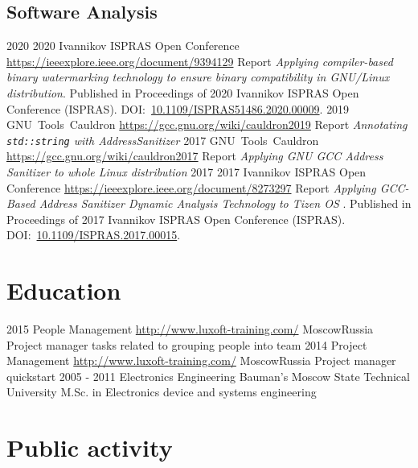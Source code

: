 \documentclass[11pt,a4paper]{moderncv}
\begin{document}
\subsection{Software Analysis}
  \cventry
    {2020}
    {2020 Ivannikov ISPRAS Open Conference}
    {\url{https://ieeexplore.ieee.org/document/9394129}}
    {}{}
    {Report \textit{Applying compiler-based binary watermarking technology to
        ensure binary compatibility in GNU/Linux distribution}.\newline{}
      Published in Proceedings of 2020 Ivannikov ISPRAS Open Conference
      (ISPRAS).\newline{}
      DOI:~\href{https://doi.org/10.1109/ISPRAS51486.2020.00009}{10.1109/ISPRAS51486.2020.00009}.
    }
  \cventry
    {2019}
    {GNU~Tools~Cauldron}
    {\url{https://gcc.gnu.org/wiki/cauldron2019}}
    {}{}
    {Report \textit{Annotating \texttt{std::string} with AddressSanitizer}}
  \cventry
    {2017}
    {GNU~Tools~Cauldron}
    {\url{https://gcc.gnu.org/wiki/cauldron2017}}
    {}{}
    {Report \textit{Applying GNU GCC Address Sanitizer to whole Linux distribution}}
  \cventry
    {2017}
    {2017 Ivannikov ISPRAS Open Conference}
    {\url{https://ieeexplore.ieee.org/document/8273297}}
    {}{}
    {Report \textit{Applying GCC-Based Address Sanitizer Dynamic Analysis
        Technology to Tizen OS }.\newline{}
      Published in Proceedings of 2017 Ivannikov ISPRAS Open Conference
      (ISPRAS).\newline{}
      DOI:~\href{https://doi.org/10.1109/ISPRAS.2017.00015}{10.1109/ISPRAS.2017.00015}.
    }
\section{Education}
  \cventry
    {2015}
    {People Management}
    {\url{http://www.luxoft-training.com/}}
    {Moscow}{Russia}
    {Project manager tasks related to grouping people into team}
  \cventry
    {2014}
    {Project Management}
    {\url{http://www.luxoft-training.com/}}
    {Moscow}{Russia}
    {Project manager quickstart}
  \cventry
    {2005 - 2011}
    {Electronics Engineering}
    {Bauman's Moscow State Technical University}
    {}{}
    {M.Sc. in Electronics device and systems engineering}
\section{Public activity}
\end{document}
